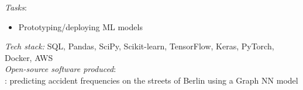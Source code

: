\documentclass[
	a4paper,
]{fortysecondscv}
\begin{document}
\begin{cvtable}[1.0]
	{\href{https://datascienceretreat.com}{\color{pblue}{DSR, Germany}}}
	{\textit{Tasks}: 
    \begin{itemize}[topsep=0pt,itemsep=0pt,partopsep=0pt, parsep=0pt, leftmargin=*]
     \setlength\itemsep{1mm}
     \item Prototyping/deploying ML models %
    \end{itemize}
    \textit{Tech stack:} SQL, Pandas, SciPy, Scikit-learn, TensorFlow, Keras, PyTorch, Docker, AWS\\
    \textit{Open-source software produced}:\\
    \href{https://onurkerimoglu.pythonanywhere.com}{\color{pblue}{AccIndex}}: predicting accident frequencies on the streets of Berlin using a Graph NN model %
    }
    

\end{cvtable}
\end{document}
